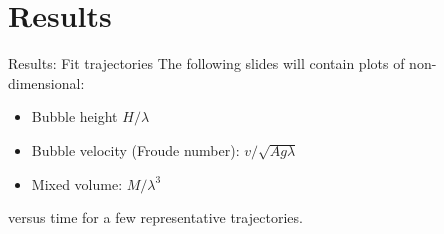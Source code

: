 \documentclass[12pt]{beamer}
\begin{document}
\section{Results}
\begin{frame}[c]{Results: Fit trajectories}
The following slides will contain plots of non-dimensional:
\begin{itemize}
  \item Bubble height $H / \lambda$
  \item Bubble velocity (Froude number): $v / \sqrt{A g \lambda}$
  \item Mixed volume: $M / \lambda^3$
\end{itemize}
versus time for a few representative trajectories.
\end{frame}
\end{document}

